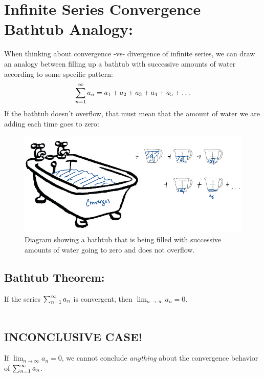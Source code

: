 
\setlength{\columnseprule}{.4pt}
\setlength{\columnsep}{3em}

\section*{Infinite Series Convergence  Bathtub Analogy: }
When thinking about convergence -vs- divergence of infinite series, we can draw an analogy between filling up a bathtub with successive amounts of water according to some specific pattern:
\[
\sum_{n=1}^\infty a_n = a_1 + a_2 + a_3 + a_4 + a_5 + \ldots
\]
If the bathtub doesn't overflow, that must mean that the amount of water we are adding each time goes to zero:\\

\begin{figure}[!h]
\includegraphics[width=.9\columnwidth]{Ch8s2-bath-conv.png}
\caption{Diagram showing a bathtub that is being filled with successive amounts of water going to zero and does not overflow.}
\end{figure}

\subsection*{Bathtub Theorem:}
If the series \(\sum_{n=1}^\infty a_n\) is convergent, then \(\lim_{n\rightarrow\infty} a_n = 0\).\\~\\

\subsection*{INCONCLUSIVE CASE!}
If \(\lim_{n\rightarrow\infty} a_n = 0\), we cannot conclude \textit{anything} about the convergence behavior of \(\sum_{n=1}^\infty a_n\).

